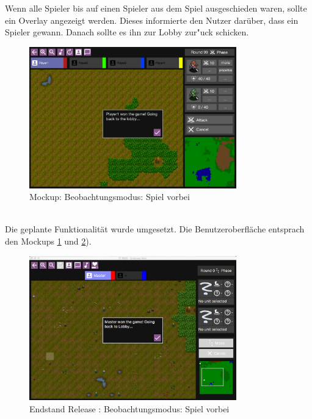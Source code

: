\documentclass[12pt, titlepage]{scrartcl}
\newcommand{\RN}[1]{%
	\textup{\uppercase\expandafter{\romannumeral#1}}%
}
\newcounter{subsubsubsection}[subsubsection]
\begin{document}
					Wenn alle Spieler bis auf einen Spieler aus dem Spiel ausgeschieden waren, sollte ein Overlay angezeigt werden. Dieses informierte den Nutzer dar\"uber, dass ein Spieler gewann. Danach sollte es ihn zur Lobby zur"uck schicken.
					\begin{figure}[H] 
						\centering
						\includegraphics[width=0.8\textwidth]{images/mockups/SpectatorEnd.png}
						\caption{Mockup: Beobachtungsmodus: Spiel vorbei}
						\label{Spectator_End_2}
					\end{figure}
					\ \\ Die geplante Funktionalit\"at wurde umgesetzt. Die Benutzeroberfl\"ache entsprach den Mockups \ref{Spectator_End_2} und \ref{End_Spectator_End}).
					\begin{figure}[H] 
						\centering
						\includegraphics[width=0.8\textwidth]{images/endOfRelease/SpectatorEnd.png}
						\caption{Endstand Release \RN{3}: Beobachtungsmodus: Spiel vorbei}
						\label{End_Spectator_End}
					\end{figure}
\end{document}
